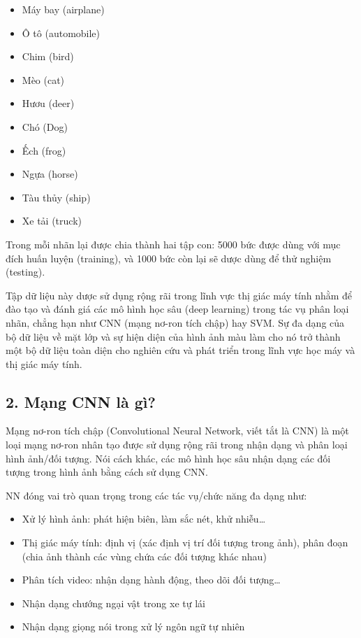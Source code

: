 \documentclass[../main.tex]{subfiles}
\begin{document}
\begin{multicols}{2}
    \begin{itemize}
        \item Máy bay (airplane)
        \item Ô tô (automobile)
        \item Chim (bird)
        \item Mèo (cat)
        \item Hươu (deer)
        \item Chó (Dog)
        \item Ếch (frog)
        \item Ngựa (horse)
        \item Tàu thủy (ship)
        \item Xe tải (truck)
    \end{itemize}
\end{multicols}


Trong mỗi nhãn lại được chia thành hai tập con: 5000 bức được dùng với mục đích huấn luyện (training), và 1000 bức còn lại sẽ dược dùng để thử nghiệm (testing).

Tập dữ liệu này dược sử dụng rộng rãi trong lĩnh vực thị giác máy tính nhằm để đào tạo và đánh giá các mô hình học sâu (deep learning) trong tác vụ phân loại nhãn, chẳng hạn như CNN (mạng nơ-ron tích chập) hay SVM. Sự đa dạng của bộ dữ liệu về mặt lớp và sự hiện diện của hình ảnh màu làm cho nó trở thành một bộ dữ liệu toàn diện cho nghiên cứu và phát triển trong lĩnh vực học máy và thị giác máy tính.
\\[-20pt]
\subsection*{2. Mạng CNN là gì?}

Mạng nơ-ron tích chập (Convolutional Neural Network, viết tắt là CNN) là một loại mạng nơ-ron nhân tạo được sử dụng rộng rãi trong nhận dạng và phân loại hình ảnh/đối tượng. Nói cách khác, các mô hình học sâu nhận dạng các đối tượng trong hình ảnh bằng cách sử dụng CNN.

NN đóng vai trò quan trọng trong các tác vụ/chức năng đa dạng như:

\begin{itemize}
    \item Xử lý hình ảnh: phát hiện biên, làm sắc nét, khử nhiễu\dots
    \item Thị giác máy tính: định vị (xác định vị trí đối tượng trong ảnh), phân đoạn (chia ảnh thành các vùng chứa các đối tượng khác nhau)
    \item Phân tích video: nhận dạng hành động, theo dõi đối tượng\dots
    \item Nhận dạng chướng ngại vật trong xe tự lái
    \item Nhận dạng giọng nói trong xử lý ngôn ngữ tự nhiên
\end{itemize}
\end{document}

